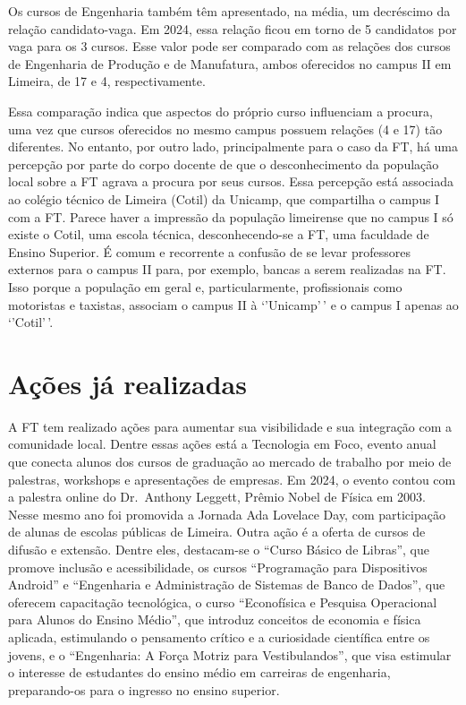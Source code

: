 \documentclass[
  letterpaper,
  DIV=11,
  numbers=noendperiod]{scrreprt}
\begin{document}
Os cursos de Engenharia também têm apresentado, na média, um decréscimo
da relação candidato-vaga. Em 2024, essa relação ficou em torno de 5
candidatos por vaga para os 3 cursos. Esse valor pode ser comparado com
as relações dos cursos de Engenharia de Produção e de Manufatura, ambos
oferecidos no campus II em Limeira, de 17 e 4, respectivamente.

Essa comparação indica que aspectos do próprio curso influenciam a
procura, uma vez que cursos oferecidos no mesmo campus possuem relações
(4 e 17) tão diferentes. No entanto, por outro lado, principalmente para
o caso da FT, há uma percepção por parte do corpo docente de que o
desconhecimento da população local sobre a FT agrava a procura por seus
cursos. Essa percepção está associada ao colégio técnico de Limeira
(Cotil) da Unicamp, que compartilha o campus I com a FT. Parece haver a
impressão da população limeirense que no campus I só existe o Cotil, uma
escola técnica, desconhecendo-se a FT, uma faculdade de Ensino Superior.
É comum e recorrente a confusão de se levar professores externos para o
campus II para, por exemplo, bancas a serem realizadas na FT. Isso
porque a população em geral e, particularmente, profissionais como
motoristas e taxistas, associam o campus II à `'Unicamp'\,' e o campus I
apenas ao `'Cotil'\,'.

\section{Ações já realizadas}\label{auxe7uxf5es-juxe1-realizadas}

A FT tem realizado ações para aumentar sua visibilidade e sua integração
com a comunidade local. Dentre essas ações está a Tecnologia em Foco,
evento anual que conecta alunos dos cursos de graduação ao mercado de
trabalho por meio de palestras, workshops e apresentações de empresas.
Em 2024, o evento contou com a palestra online do Dr.~Anthony Leggett,
Prêmio Nobel de Física em 2003. Nesse mesmo ano foi promovida a Jornada
Ada Lovelace Day, com participação de alunas de escolas públicas de
Limeira. Outra ação é a oferta de cursos de difusão e extensão. Dentre
eles, destacam-se o ``Curso Básico de Libras'', que promove inclusão e
acessibilidade, os cursos ``Programação para Dispositivos Android'' e
``Engenharia e Administração de Sistemas de Banco de Dados'', que
oferecem capacitação tecnológica, o curso ``Econofísica e Pesquisa
Operacional para Alunos do Ensino Médio'', que introduz conceitos de
economia e física aplicada, estimulando o pensamento crítico e a
curiosidade científica entre os jovens, e o ``Engenharia: A Força Motriz
para Vestibulandos'', que visa estimular o interesse de estudantes do
ensino médio em carreiras de engenharia, preparando-os para o ingresso
no ensino superior.
\end{document}
